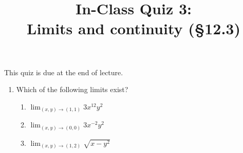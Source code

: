 \documentclass[]{article}
\title{\vspace{-3.5pc} 
	\flushleft \bf \Large In-Class Quiz 3: \\ Limits and continuity (\S 12.3)}
\date{}
\begin{document}
\maketitle

\vspace{-3pc}
 This quiz is due at the end of lecture.  

\noindent\hrulefill

\begin{enumerate}

\item %
Which of the following limits exist?
\begin{enumerate}
	\item $\lim_{(x,y)\to(1,1)}3x^{12}y^2$
	\vspace{10pc}
	
	\item $\lim_{(x,y)\to(0,0)}3x^{-2}y^2$
	\vspace{10pc}
	
	\item $\lim_{(x,y)\to(1,2)}\sqrt{x-y^2}$

\end{enumerate}

\end{enumerate}
\end{document}
